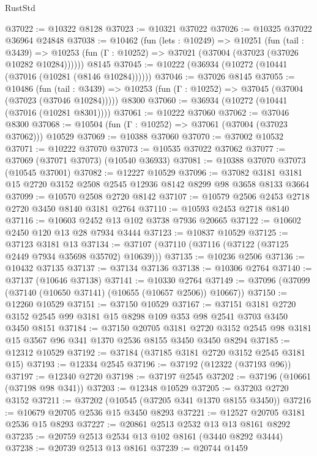 \begin{lexlean}{RustStd}
\begin{coremodule}
@37022 := @10322 @8128
@37023 := @10321 @37022
@37026 := @10325 @37022 @36964 @24848
@37038 := @10462
    (fun (lets : @10249) =>
    @10251
      (fun (tail : @3439) =>
      @10253 (fun (Γ : @10252) => @37021 (@37004 (@37023 (@37026 @10282 @10284))))))
    @8145
@37045 := @10222 (@36934 (@10272 (@10441 (@37016 (@10281 (@8146 @10284))))))
@37046 := @37026 @8145
@37055 := @10486
    (fun (tail : @3439) => @10253 (fun (Γ : @10252) => @37045 (@37004 (@37023 (@37046 @10284)))))
    @8300
@37060 := @36934 (@10272 (@10441 (@37016 (@10281 @8301))))
@37061 := @10222 @37060
@37062 := @37046 @8300
@37068 := @10504 (fun (Γ : @10252) => @37061 (@37004 (@37023 @37062))) @10529
@37069 := @10388 @37060
@37070 := @37002 @10532
@37071 := @10222 @37070
@37073 := @10535 @37022 @37062
@37077 := @37069 (@37071 @37073) (@10540 @36933)
@37081 := @10388 @37070 @37073 (@10545 @37001)
@37082 := @12227 @10529
@37096 := @37082 @3181 @3181 @15 @2720 @3152 @2508 @2545 @12936 @8142 @8299 @98 @3658 @8133 @3664
@37099 := @10570 @2508 @2720 @8142
@37107 := @10579 @2506 @2453 @2718 @2720 @3450 @8140 @3181 @2764
@37110 := @10593 @2453 @2718 @8140
@37116 := @10603 @2452 @13 @102 @3738 @7936 @20665
@37122 := @10602 @2450 @120 @13 @28 @7934 @3444
@37123 := @10837 @10529
@37125 := @37123 @3181 @13
@37134 := @37107 (@37110 (@37116 (@37122 (@37125 @2449 @7934 @35698 @35702) @10639)))
@37135 := @10236 @2506
@37136 := @10432 @37135
@37137 := @37134 @37136
@37138 := @10306 @2764
@37140 := @37137 (@10646 @37138)
@37141 := @10330 @2764
@37149 := @37096 (@37099 (@37140 (@10650 @37141) (@10655 (@10657 @2506)) @10667))
@37150 := @12260 @10529
@37151 := @37150 @10529
@37167 := @37151
    @3181
    @2720
    @3152
    @2545
    @99
    @3181
    @15
    @8298
    @109
    @353
    @98
    @2541
    @3703
    @3450
    @3450
    @8151
@37184 := @37150
    @20705
    @3181
    @2720
    @3152
    @2545
    @98
    @3181
    @15
    @3567
    @96
    @341
    @1370
    @2536
    @8155
    @3450
    @3450
    @8294
@37185 := @12312 @10529
@37192 := @37184 (@37185 @3181 @2720 @3152 @2545 @3181 @15)
@37193 := @12334 @2545
@37196 := @37192 (@12322 (@37193 @96))
@37197 := @12340 @2720
@37198 := @37197 @2545
@37202 := @37196 (@10661 (@37198 @98 @341))
@37203 := @12348 @10529
@37205 := @37203 @2720 @3152
@37211 := @37202 (@10545 (@37205 @341 @1370 @8155 @3450))
@37216 := @10679 @20705 @2536 @15 @3450 @8293
@37221 := @12527 @20705 @3181 @2536 @15 @8293
@37227 := @20861 @2513 @2532 @13 @13 @8161 @8292
@37235 := @20759 @2513 @2534 @13 @102 @8161 (@3440 @8292 @3444)
@37238 := @20739 @2513 @13 @8161
@37239 := @20744 @1459

\end{coremodule}
\end{lexlean}
